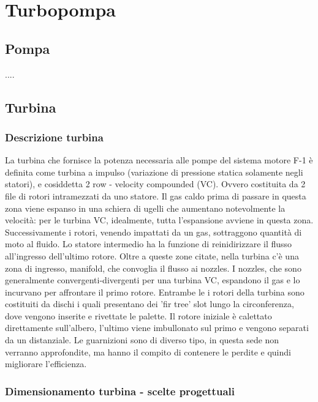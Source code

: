 \section{Turbopompa}
\label{sec:turbopompa}

\subsection{Pompa}
\label{subsec:pompa}

....
\subsection{Turbina}
\label{subsec:turbina}

\subsubsection{Descrizione turbina}


La turbina che fornisce la potenza necessaria alle pompe del sistema motore F-1 è definita come turbina a impulso (variazione di pressione statica solamente negli statori), e cosiddetta 2 row - velocity compounded (VC). Ovvero costituita da 2 file di rotori intramezzati da uno statore. Il gas caldo prima di passare in questa zona viene espanso in una schiera di ugelli che aumentano notevolmente la velocità: per le turbina VC, idealmente, tutta l'espansione avviene in questa zona. Successivamente i rotori, venendo impattati da un gas, sottraggono quantità di moto al fluido. Lo statore intermedio ha la funzione di reinidirizzare il flusso all'ingresso dell'ultimo rotore. Oltre a queste zone citate, nella turbina c'è una zona di ingresso, manifold, che convoglia il flusso ai nozzles. I nozzles, che sono generalmente convergenti-divergenti per una turbina VC, espandono il gas e lo incurvano per affrontare il primo rotore. Entrambe le i rotori della turbina sono costituiti da dischi i quali presentano dei 'fir tree' slot lungo la circonferenza, dove vengono inserite e rivettate le palette. Il rotore iniziale è calettato direttamente sull'albero, l'ultimo viene imbullonato sul primo e vengono separati da un distanziale. Le guarnizioni sono di diverso tipo, in questa sede non verranno approfondite, ma hanno il compito di contenere le perdite e quindi migliorare l'efficienza. 

\subsubsection{Dimensionamento turbina - scelte progettuali}

